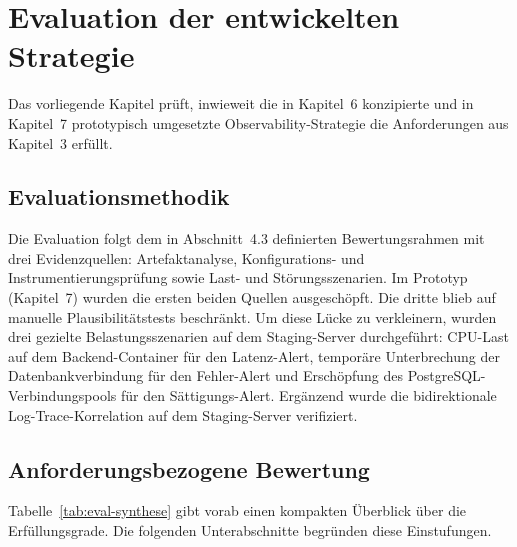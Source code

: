 
\chapter{Evaluation der entwickelten Strategie}

Das vorliegende Kapitel prüft, inwieweit die in Kapitel~6 konzipierte und in Kapitel~7 prototypisch umgesetzte Observability-Strategie die Anforderungen aus Kapitel~3 erfüllt.


\section{Evaluationsmethodik}

Die Evaluation folgt dem in Abschnitt~4.3 definierten Bewertungsrahmen mit drei Evidenzquellen: Artefaktanalyse, Konfigurations- und Instrumentierungsprüfung sowie Last- und Störungsszenarien. Im Prototyp (Kapitel~7) wurden die ersten beiden Quellen ausgeschöpft. Die dritte blieb auf manuelle Plausibilitätstests beschränkt. Um diese Lücke zu verkleinern, wurden drei gezielte Belastungsszenarien auf dem Staging-Server durchgeführt: CPU-Last auf dem Backend-Container für den Latenz-Alert, temporäre Unterbrechung der Datenbankverbindung für den Fehler-Alert und Erschöpfung des PostgreSQL-Verbindungspools für den Sättigungs-Alert. Ergänzend wurde die bidirektionale Log-Trace-Korrelation auf dem Staging-Server verifiziert.


\section{Anforderungsbezogene Bewertung}

Tabelle~\ref{tab:eval-synthese} gibt vorab einen kompakten Überblick über die Erfüllungsgrade. Die folgenden Unterabschnitte begründen diese Einstufungen.

